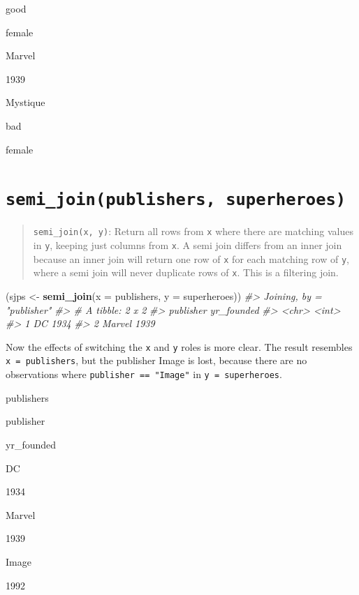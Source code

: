 \documentclass[
]{book}
\newenvironment{Shaded}{\begin{snugshade}}{\end{snugshade}}
\newcommand{\CommentTok}[1]{\textcolor[rgb]{0.56,0.35,0.01}{\textit{#1}}}
\newcommand{\DataTypeTok}[1]{\textcolor[rgb]{0.13,0.29,0.53}{#1}}
\newcommand{\KeywordTok}[1]{\textcolor[rgb]{0.13,0.29,0.53}{\textbf{#1}}}
\newcommand{\NormalTok}[1]{#1}
\newcommand{\StringTok}[1]{\textcolor[rgb]{0.31,0.60,0.02}{#1}}
\begin{document}
good

female

Marvel

1939

Mystique

bad

female

\hypertarget{semi_joinpublishers-superheroes}{%
\section{\texorpdfstring{\texttt{semi\_join(publishers,\ superheroes)}}{semi\_join(publishers, superheroes)}}\label{semi_joinpublishers-superheroes}}

\begin{quote}
\texttt{semi\_join(x,\ y)}: Return all rows from \texttt{x} where there are matching values in \texttt{y}, keeping just columns from \texttt{x}. A semi join differs from an inner join because an inner join will return one row of \texttt{x} for each matching row of \texttt{y}, where a semi join will never duplicate rows of \texttt{x}. This is a filtering join.
\end{quote}

\begin{Shaded}
\begin{Highlighting}[]
\NormalTok{(sjps <-}\StringTok{ }\KeywordTok{semi_join}\NormalTok{(}\DataTypeTok{x =}\NormalTok{ publishers, }\DataTypeTok{y =}\NormalTok{ superheroes))}
\CommentTok{#> Joining, by = "publisher"}
\CommentTok{#> # A tibble: 2 x 2}
\CommentTok{#>   publisher yr_founded}
\CommentTok{#>   <chr>          <int>}
\CommentTok{#> 1 DC              1934}
\CommentTok{#> 2 Marvel          1939}
\end{Highlighting}
\end{Shaded}

Now the effects of switching the \texttt{x} and \texttt{y} roles is more clear. The result resembles \texttt{x\ =\ publishers}, but the publisher Image is lost, because there are no observations where \texttt{publisher\ ==\ "Image"} in \texttt{y\ =\ superheroes}.

publishers

publisher

yr\_founded

DC

1934

Marvel

1939

Image

1992
\end{document}
